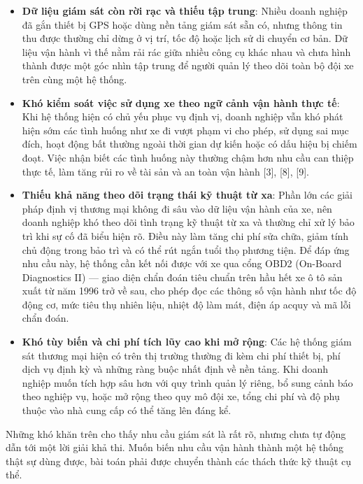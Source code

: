 \documentclass[a4paper]{extarticle}
\providecommand{\tightlist}{%
  \setlength{\itemsep}{0pt}\setlength{\parskip}{0pt}}
\begin{document}
\begin{itemize}
\tightlist
\item
  \textbf{Dữ liệu giám sát còn rời rạc và thiếu tập trung}: Nhiều doanh
  nghiệp đã gắn thiết bị GPS hoặc dùng nền tảng giám sát sẵn có, nhưng
  thông tin thu được thường chỉ dừng ở vị trí, tốc độ hoặc lịch sử di
  chuyển cơ bản. Dữ liệu vận hành vì thế nằm rải rác giữa nhiều công cụ
  khác nhau và chưa hình thành được một góc nhìn tập trung để người quản
  lý theo dõi toàn bộ đội xe trên cùng một hệ thống.
\item
  \textbf{Khó kiểm soát việc sử dụng xe theo ngữ cảnh vận hành thực tế}: Khi
  hệ thống hiện có chủ yếu phục vụ định vị, doanh nghiệp vẫn khó phát
  hiện sớm các tình huống như xe đi vượt phạm vi cho phép, sử dụng sai
  mục đích, hoạt động bất thường ngoài thời gian dự kiến hoặc có dấu hiệu
  bị chiếm đoạt. Việc nhận biết các tình huống này thường chậm hơn nhu
  cầu can thiệp thực tế, làm tăng rủi ro về tài sản và an toàn vận hành
  {[}3{]}, {[}8{]}, {[}9{]}.
\item
  \textbf{Thiếu khả năng theo dõi trạng thái kỹ thuật từ xa}: Phần lớn các
  giải pháp định vị thương mại không đi sâu vào dữ liệu vận hành của xe,
  nên doanh nghiệp khó theo dõi tình trạng kỹ thuật từ xa và thường chỉ
  xử lý bảo trì khi sự cố đã biểu hiện rõ. Điều này làm tăng chi phí sửa
  chữa, giảm tính chủ động trong bảo trì và có thể rút ngắn tuổi thọ
  phương tiện. Để đáp ứng nhu cầu này, hệ thống cần kết nối được với xe
  qua cổng OBD2 (On-Board Diagnostics II) --- giao diện chẩn đoán tiêu chuẩn
  trên hầu hết xe ô tô sản xuất từ năm 1996 trở về sau, cho phép đọc
  các thông số vận hành như tốc độ động cơ, mức tiêu thụ nhiên liệu,
  nhiệt độ làm mát, điện áp acquy và mã lỗi chẩn đoán.
\item
  \textbf{Khó tùy biến và chi phí tích lũy cao khi mở rộng}: Các hệ thống
  giám sát thương mại hiện có trên thị trường thường đi kèm chi phí thiết
  bị, phí dịch vụ định kỳ và những ràng buộc nhất định về nền tảng. Khi
  doanh nghiệp muốn tích hợp sâu hơn với quy trình quản lý riêng, bổ sung
  cảnh báo theo nghiệp vụ, hoặc mở rộng theo quy mô đội xe, tổng chi phí
  và độ phụ thuộc vào nhà cung cấp có thể tăng lên đáng kể.
\end{itemize}

Những khó khăn trên cho thấy nhu cầu giám sát là rất rõ, nhưng chưa tự
động dẫn tới một lời giải khả thi. Muốn biến nhu cầu vận hành thành một
hệ thống thật sự dùng được, bài toán phải được chuyển thành các thách
thức kỹ thuật cụ thể.
\end{document}
